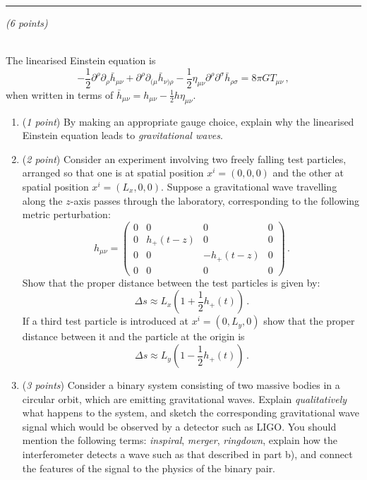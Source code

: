 \documentclass[12pt]{article}
\newcommand{\be}{\begin{equation}}
\newcommand{\ee}{\end{equation}}
\newcommand{\bh}{\bar{h}}
\newcounter{quesno}
\newcommand{\ques}[1]{\vspace{2em}\stepcounter{quesno}
\noindent{\bf Question \thequesno.} \emph{(#1 points)\\}
}
\begin{document}
\vspace{1.5em}
\hrule

\ques{6}
\\
The linearised Einstein equation is
\be
- \frac{1}{2} \partial^\rho\partial_\rho \bh_{\mu\nu} + \partial^\rho \partial_{(\mu} \bh_{\nu)\rho}
- \frac{1}{2} \eta_{\mu\nu} \partial^\rho \partial^\sigma \bh_{\rho\sigma} = 8 \pi G T_{\mu\nu} \,,
\ee
when written in terms of $\bh_{\mu\nu} = h_{\mu\nu} - \frac{1}{2} h \eta_{\mu\nu}$. 

\begin{enumerate}[label=\alph*)]
\item (\emph{1 point}) By making an appropriate gauge choice, explain why the linearised Einstein equation leads to \emph{gravitational waves}.
\item (\emph{2 point}) Consider an experiment involving two freely falling test particles, arranged so that one is at spatial position $x^i = (0,0,0)$ and the other at spatial position $x^i=(L_x,0,0)$.
Suppose a gravitational wave travelling along the $z$-axis passes through the laboratory, corresponding to the following metric perturbation:
\be
h_{\mu\nu} = \begin{pmatrix}
0 & 0 & 0 & 0 \\
0 & h_{+}(t-z) & 0 & 0 \\
0 & 0 & - h_{+}(t-z) & 0 \\
0 & 0 & 0 & 0
\end{pmatrix} \,.
\ee
Show that the proper distance between the test particles is given by: 
\be
\Delta s \approx L_x \left( 1 + \frac{1}{2} h_{+}(t) \right) \,.
\ee
If a third test particle is introduced at $x^i=(0,L_y,0)$ show that the proper distance between it and the particle at the origin is
\be
\Delta s \approx L_y \left( 1 - \frac{1}{2} h_{+}(t) \right) \,.
\ee
\item (\emph{3 points}) Consider a binary system consisting of two massive bodies in a circular orbit, which are emitting gravitational waves.
Explain \emph{qualitatively} what happens to the system, and sketch the corresponding gravitational wave signal which would be observed by a detector such as LIGO.
You should mention the following terms: \emph{inspiral}, \emph{merger}, \emph{ringdown}, explain how the interferometer detects a wave such as that described in part b), and connect the features of the signal to the physics of the binary pair. 
\end{enumerate}
\end{document}
